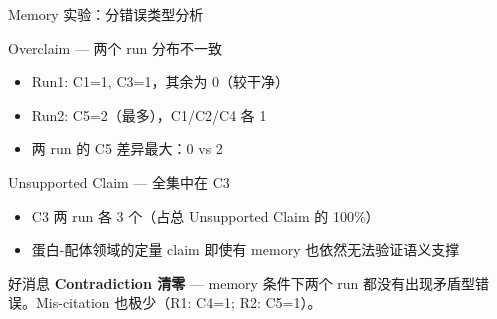 \documentclass[UTF8,fontset=fandol,aspectratio=169]{ctexbeamer}
\begin{document}
\begin{frame}{Memory 实验：分错误类型分析}
  \begin{block}{Overclaim — 两个 run 分布不一致}
    \begin{itemize}
      \setlength{\itemsep}{2pt}
      \item Run1: C1=1, C3=1，其余为 0（较干净）
      \item Run2: C5=2（最多），C1/C2/C4 各 1
      \item 两 run 的 C5 差异最大：0 vs 2
    \end{itemize}
  \end{block}

  \vspace{0.3em}
  \begin{block}{Unsupported Claim — 全集中在 C3}
    \begin{itemize}
      \setlength{\itemsep}{2pt}
      \item C3 两 run 各 3 个（占总 Unsupported Claim 的 100\%）
      \item 蛋白-配体领域的定量 claim 即使有 memory 也依然无法验证语义支撑
    \end{itemize}
  \end{block}

  \vspace{0.3em}
  \begin{alertblock}{好消息}
    \textbf{Contradiction 清零} — memory 条件下两个 run 都没有出现矛盾型错误。Mis-citation 也极少（R1: C4=1; R2: C5=1）。
  \end{alertblock}
\end{frame}
\end{document}
